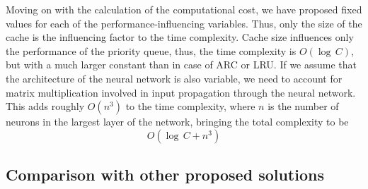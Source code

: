 Moving on with the calculation of the computational cost, we have proposed fixed values for each of the performance-influencing variables. Thus, only the size of the cache is the influencing factor to the time complexity. Cache size influences only the performance of the priority queue, thus, the time complexity is $ O(\log\,C) $, but with a much larger constant than in case of ARC or LRU. If we assume that the architecture of the neural network is also variable, we need to account for matrix multiplication involved in input propagation through the neural network. This adds roughly $ O(n^3) $ to the time complexity, where $n$ is the number of neurons in the largest layer of the network, bringing the total complexity to be $$ O(\log \, C + n^3) $$

\subsection{Comparison with other proposed solutions} \label{comparison}

